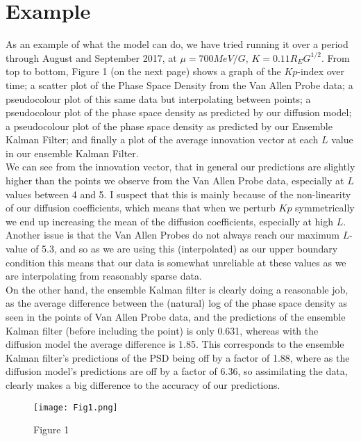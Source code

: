\documentclass[a4paper, fleqn]{article}
\begin{document}
\section{Example}
As an example of what the model can do, we have tried running it over a period through August and September 2017, at $\mu=700MeV/G,\, K=0.11R_EG^{1/2}$. From top to bottom, Figure 1 (on the next page) shows a graph of the $Kp$-index over time; a scatter plot of the Phase Space Density from the Van Allen Probe data; a pseudocolour plot of this same data but interpolating between points; a pseudocolour plot of the phase space density as predicted by our diffusion model; a pseudocolour plot of the phase space density as predicted by our Ensemble Kalman Filter; and finally a plot of the average innovation vector at each $L$ value in our ensemble Kalman Filter. \\
We can see from the innovation vector, that in general our predictions are slightly higher than the points we observe from the Van Allen Probe data, especially at $L$ values between 4 and 5. I suspect that this is mainly because of the non-linearity of our diffusion coefficients, which means that when we perturb $Kp$ symmetrically we end up increasing the mean of the diffusion coefficients, especially at high $L$. Another issue is that the Van Allen Probes do not always reach our maximum $L$-value of 5.3, and so as we are using this (interpolated) as our upper boundary condition this means that our data is somewhat unreliable at these values as we are interpolating from reasonably sparse data.\\
On the other hand, the ensemble Kalman filter is clearly doing a reasonable job, as the average difference between the (natural) log of the phase space density as seen in the points of Van Allen Probe data, and the predictions of the ensemble Kalman filter (before including the point) is only 0.631, whereas with the diffusion model the average difference is 1.85. This corresponds to the ensemble Kalman filter's predictions of the PSD being off by a factor of 1.88, where as the diffusion model's predictions are off by a factor of 6.36, so assimilating the data, clearly makes a big difference to the accuracy of our predictions.
\begin{figure}
  \centering
  \texttt{[image: Fig1.png]}
  \caption{Figure 1}
  \label{fig:fig1}
\end{figure}
\end{document}
